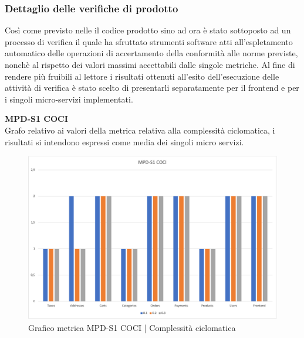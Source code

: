 \subsubsection{Dettaglio delle verifiche di prodotto}
Così come previsto nelle  il codice prodotto sino ad ora è stato sottoposto ad un processo di verifica il quale 
ha sfruttato strumenti software atti all'espletamento automatico delle operazioni di accertamento della conformità alle norme previste, nonchè
al rispetto dei valori massimi accettabili dalle singole metriche.
Al fine di rendere più fruibili al lettore i risultati ottenuti all'esito dell'esecuzione delle attività di verifica è stato scelto di presentarli
separatamente per il frontend e per i singoli micro-servizi implementati.

\begin{center}
    \textbf{MPD-S1 COCI} \\
    Grafo relativo ai valori della metrica relativa alla complessità ciclomatica, i risultati si intendono espressi come media dei singoli
    micro servizi.
    \begin{figure}[!htb]
        \centering
        \includegraphics[scale=0.50]{res/images/RQcoci.png}
        \caption{Grafico metrica MPD-S1 COCI | Complessità ciclomatica}
    \end{figure}
    \begin{center}
        
    \end{center}
\end{center}

\newpage

